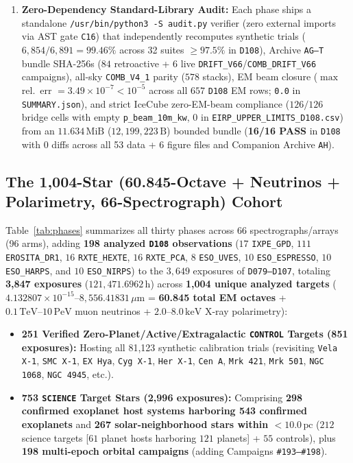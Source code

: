 \documentclass[twocolumn,10pt]{article}
\begin{document}
\begin{enumerate}
  \item \textbf{Zero-Dependency Standard-Library Audit:} Each phase ships a standalone \texttt{/usr/bin/python3 -S audit.py} verifier (zero external imports via AST gate \texttt{C16}) that independently recomputes synthetic trials ($6{,}854/6{,}891 = 99.46\%$ across 32 suites $\ge 97.5\%$ in \texttt{D108}), Archive \texttt{AG--T} bundle SHA-256s ($84$ retroactive + $6$ live \texttt{DRIFT\_V66}/\texttt{COMB\_DRIFT\_V66} campaigns), all-sky \texttt{COMB\_V4\_1} parity ($578$ stacks), EM beam closure ($\max$ rel.\ err $= 3.49\times 10^{-7} < 10^{-5}$ across all $657$ \texttt{D108} EM rows; \texttt{0.0} in \texttt{SUMMARY.json}), and strict IceCube zero-EM-beam compliance ($126/126$ bridge cells with empty \texttt{p\_beam\_10m\_kw}, $0$ in \texttt{EIRP\_UPPER\_LIMITS\_D108.csv}) from an $11.634\,\text{MiB}$ ($12{,}199{,}223\,\text{B}$) bounded bundle (\textbf{16/16 PASS} in \texttt{D108} with $0$ diffs across all 53 data + 6 figure files and Companion Archive \texttt{AH}).
\end{enumerate}

\subsection{The 1,004-Star (60.845-Octave + Neutrinos + Polarimetry, 66-Spectrograph) Cohort}
Table~\ref{tab:phases} summarizes all thirty phases across 66 spectrographs/arrays (96 arms), adding \textbf{198 analyzed \texttt{D108} observations} ($17$ \texttt{IXPE\_GPD}, $111$ \texttt{EROSITA\_DR1}, $16$ \texttt{RXTE\_HEXTE}, $16$ \texttt{RXTE\_PCA}, $8$ \texttt{ESO\_UVES}, $10$ \texttt{ESO\_ESPRESSO}, $10$ \texttt{ESO\_HARPS}, and $10$ \texttt{ESO\_NIRPS}) to the $3{,}649$ exposures of \texttt{D079--D107}, totaling \textbf{3,847 exposures} ($121{,}471.6962\,\text{h}$) across \textbf{1,004 unique analyzed targets} ($4.132807\times 10^{-15}\text{--}8{,}556.41831\,\mu\text{m}$ = \textbf{60.845 total EM octaves} + $0.1\,\mathrm{TeV}\text{--}10\,\mathrm{PeV}$ muon neutrinos + $2.0\text{--}8.0\,\mathrm{keV}$ X-ray polarimetry):
\begin{itemize}
  \item \textbf{251 Verified Zero-Planet/Active/Extragalactic \texttt{CONTROL} Targets (851 exposures):} Hosting all 81,123 synthetic calibration trials (revisiting \texttt{Vela\,X-1}, \texttt{SMC\,X-1}, \texttt{EX\,Hya}, \texttt{Cyg\,X-1}, \texttt{Her\,X-1}, \texttt{Cen\,A}, \texttt{Mrk\,421}, \texttt{Mrk\,501}, \texttt{NGC\,1068}, \texttt{NGC\,4945}, etc.).
  \item \textbf{753 \texttt{SCIENCE} Target Stars (2,996 exposures):} Comprising \textbf{298 confirmed exoplanet host systems harboring 543 confirmed exoplanets} and \textbf{267 solar-neighborhood stars within $<10.0\,\text{pc}$} ($212$ science targets [$61$ planet hosts harboring $121$ planets] + $55$ controls), plus \textbf{198 multi-epoch orbital campaigns} (adding Campaigns \texttt{\#193--\#198}).
\end{itemize}
\end{document}
